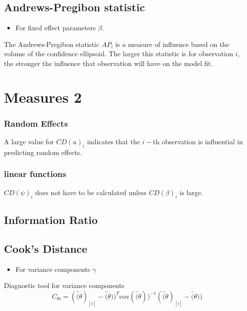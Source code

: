 \documentclass[12pt, a4paper]{report}
\begin{document}
\subsection{Andrews-Pregibon statistic} %
\begin{itemize}
	\item For fixed effect parameters $\beta$.
\end{itemize}
The Andrews-Pregibon statistic $AP_{i}$ is a measure of influence based on the volume of the confidence ellipsoid.
The larger this statistic is for observation $i$, the stronger the influence that observation will have on the model fit.





\section{Measures 2} %



\newpage
\subsubsection{Random Effects}

A large value for $CD(u)_i$ indicates that the $i-$th observation is influential in predicting random effects.

\subsubsection{linear functions}

$CD(\psi)_i$ does not have to be calculated unless $CD(\beta)_i$ is large.


\subsection{Information Ratio}


\subsection{Cook's Distance} %
\begin{itemize}
	\item For variance components $\gamma$
\end{itemize}


Diagnostic tool for variance components
\[ C_{\theta i} =(\hat(\theta)_{[i]} - \hat(\theta))^{T}\mbox{cov}( \hat(\theta))^{-1}(\hat(\theta)_{[i]} - \hat(\theta))\]
\end{document}
